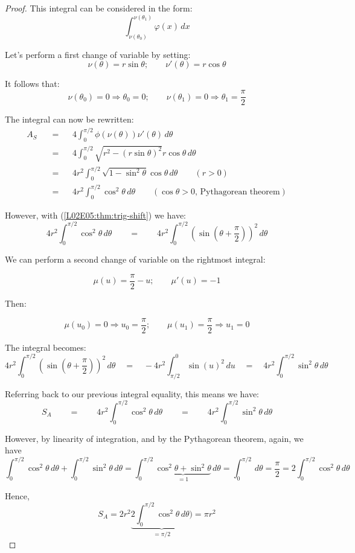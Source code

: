 \documentclass[solutions.tex]{subfiles}
\begin{document}
\begin{proof}
This integral can be considered in the form:
\[ \int_{\nu(\theta_0)}^{\nu(\theta_1)}\varphi(x)\,dx \]

Let's perform a first change of variable by setting:
\[ \nu(\theta) = r\sin\theta;\qquad \nu'(\theta) = r\cos\theta \]

It follows that:
\[
	\nu(\theta_0) = 0 \Rightarrow \theta_0 = 0;\qquad
	\nu(\theta_1) = 0 \Rightarrow \theta_1 = \frac\pi2
\]

The integral can now be rewritten:
\begin{equation*} \begin{aligned}
	A_S &\quad=&& 4\int_0^{\pi/2}\phi(\nu(\theta))\nu'(\theta)\,d\theta \\
	~ &\quad=&& 4\int_0^{\pi/2}\sqrt{r^2-(r\sin\theta)^2}r\cos\theta\,d\theta \\
	~ &\quad=&& 4r^2\int_0^{\pi/2}\sqrt{1-\sin^2\theta}\cos\theta\,d\theta\qquad (r > 0) \\
	~ &\quad=&& 4r^2\int_0^{\pi/2}\cos^2\theta\,d\theta\qquad
		(\cos\theta > 0,\,\text{Pythagorean theorem})
\end{aligned} \end{equation*}

However, with (\ref{L02E05:thm:trig-shift}) we have:
\[
	4r^2\int_0^{\pi/2}\cos^2\theta\,d\theta\qquad=\qquad
	4r^2\int_0^{\pi/2}(\sin(\theta+\frac\pi2))^2\,d\theta
\]

We can perform a second change of variable on the rightmost
integral:

\[ \mu(u) = \frac\pi2-u;\qquad \mu'(u) = -1 \]

Then:

\[
	\mu(u_0) = 0 \Rightarrow u_0 = \frac\pi2;\qquad
	\mu(u_1) = \frac\pi2 \Rightarrow u_1 = 0
\]

The integral becomes:
\[
	4r^2\int_0^{\pi/2}(\sin(\theta+\frac\pi2))^2\,d\theta
	\quad=\quad -4r^2\int_{\pi/2}^0\sin(u)^2\,du
	\quad=\quad 4r^2\int_0^{\pi/2}\sin^2\theta\,d\theta
\]

Referring back to our previous integral equality, this means
we have:
\[
	S_A\qquad=\qquad 4r^2\int_0^{\pi/2}\cos^2\theta\,d\theta\qquad=\qquad
	4r^2\int_0^{\pi/2}\sin^2\theta\,d\theta
\]

However, by linearity of integration, and by the Pythagorean theorem,
again, we have
\[
	\int_0^{\pi/2}\cos^2\theta\,d\theta
	+
	\int_0^{\pi/2}\sin^2\theta\,d\theta
	=\int_0^{\pi/2}\underbrace{\cos^2\theta+\sin^2\theta}_{=1}\,d\theta
	=\int_0^{\pi/2}\,d\theta=\frac\pi2
	=2\int_0^{\pi/2}\cos^2\theta\,d\theta
\]

Hence,
\[
	S_A = 2r^2 \underbrace{2\int_0^{\pi/2}\cos^2\theta\,d\theta)}_{=\pi/2} =
	\boxed{\pi r^2}
\]

\end{proof}
\end{document}
